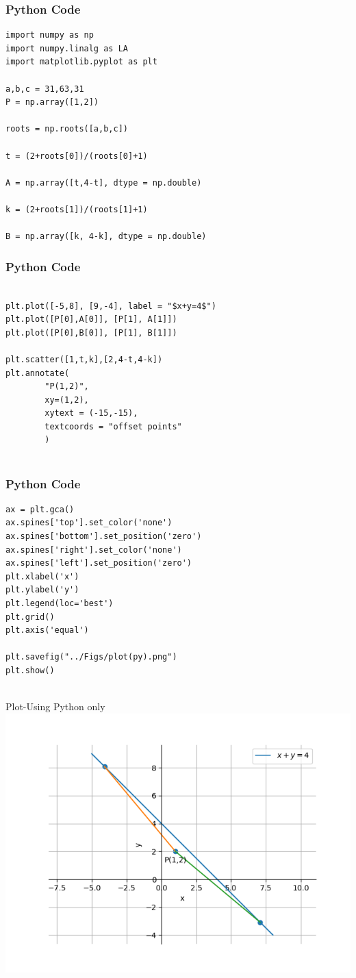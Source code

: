 \documentclass{beamer}
\begin{document}


\begin{frame}[fragile]
    \frametitle{Python Code}
    \begin{lstlisting}
import numpy as np
import numpy.linalg as LA
import matplotlib.pyplot as plt

a,b,c = 31,63,31
P = np.array([1,2])

roots = np.roots([a,b,c])

t = (2+roots[0])/(roots[0]+1)

A = np.array([t,4-t], dtype = np.double)

k = (2+roots[1])/(roots[1]+1)

B = np.array([k, 4-k], dtype = np.double)

\end{lstlisting}
\end{frame}

\begin{frame}[fragile]
    \frametitle{Python Code}
    \begin{lstlisting}

plt.plot([-5,8], [9,-4], label = "$x+y=4$")
plt.plot([P[0],A[0]], [P[1], A[1]])
plt.plot([P[0],B[0]], [P[1], B[1]])

plt.scatter([1,t,k],[2,4-t,4-k])
plt.annotate(
        "P(1,2)",
        xy=(1,2),
        xytext = (-15,-15),
        textcoords = "offset points"
        )


\end{lstlisting}
\end{frame}

\begin{frame}[fragile]
    \frametitle{Python Code}
    \begin{lstlisting}
ax = plt.gca()
ax.spines['top'].set_color('none')
ax.spines['bottom'].set_position('zero')
ax.spines['right'].set_color('none')
ax.spines['left'].set_position('zero')
plt.xlabel('x')
plt.ylabel('y')
plt.legend(loc='best')
plt.grid()
plt.axis('equal')

plt.savefig("../Figs/plot(py).png")
plt.show()


    \end{lstlisting}
\end{frame}


\begin{frame}{Plot-Using Python only}
    \centering
    \includegraphics[width=\columnwidth, height=0.8\textheight, keepaspectratio]{Figs/plot(py).png}     
\end{frame}
\end{document}
